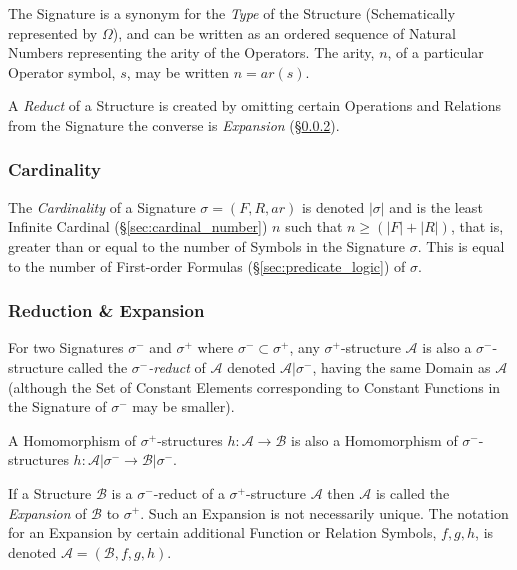 The Signature is a synonym for the \emph{Type} of the Structure
(Schematically represented by $\Omega$), and can be written as an
ordered sequence of Natural Numbers representing the arity of the
Operators. The arity, $n$, of a particular Operator symbol, $s$, may
be written $n=ar(s)$.

A \emph{Reduct} of a Structure is created by omitting certain
Operations and Relations from the Signature the converse is
\emph{Expansion} (\S\ref{sec:reduct_expansion}).



\subsubsection{Cardinality}\label{sec:signature_cardinality}

The \emph{Cardinality} of a Signature $\sigma = (F,R,ar)$ is denoted
$|\sigma|$ and is the least Infinite Cardinal
(\S\ref{sec:cardinal_number}) $n$ such that $n \geq (|F| + |R|)$, that
is, greater than or equal to the number of Symbols in the Signature
$\sigma$. This is equal to the number of First-order Formulas
(\S\ref{sec:predicate_logic}) of $\sigma$.



\subsubsection{Reduction \& Expansion}\label{sec:reduct_expansion}

For two Signatures $\sigma^-$ and $\sigma^+$ where $\sigma^- \subset
\sigma^+$, any $\sigma^+$-structure $\mathcal{A}$ is also a
$\sigma^-$-structure called the \emph{$\sigma^-$-reduct} of
$\mathcal{A}$ denoted $\mathcal{A}|\sigma^-$, having the same Domain
as $\mathcal{A}$ (although the Set of Constant Elements corresponding
to Constant Functions in the Signature of $\sigma^-$ may be smaller).

A Homomorphism of $\sigma^+$-structures $h : \mathcal{A} \rightarrow
\mathcal{B}$ is also a Homomorphism of $\sigma^-$-structures $h :
\mathcal{A} | \sigma^- \rightarrow \mathcal{B} | \sigma^-$.

If a Structure $\mathcal{B}$ is a $\sigma^-$-reduct of a
$\sigma^+$-structure $\mathcal{A}$ then $\mathcal{A}$ is called the
\emph{Expansion} of $\mathcal{B}$ to $\sigma^+$. Such an Expansion is
not necessarily unique. The notation for an Expansion by certain
additional Function or Relation Symbols, $f, g, h$, is denoted
$\mathcal{A} = (\mathcal{B}, f, g, h)$.



